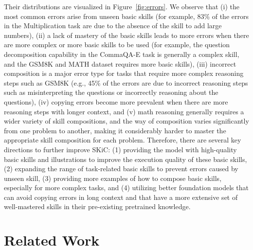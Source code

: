 \documentclass{article} \usepackage{arxiv}
\begin{document}
Their distributions are visualized in Figure~\ref{fig:errors}. We observe that (i) the most common errors arise from unseen basic skills (for example, 83\% of the errors in the Multiplication task are due to the absence of the skill to add large numbers), (ii) a lack of mastery of the basic skills leads to more errors when there are more complex or more basic skills to be used (for example, the question decomposition capability in the CommaQA-E task is generally a complex skill, and the GSM8K and MATH dataset requires more basic skills), (iii) incorrect composition is a major error type for tasks that require more complex reasoning steps such as GSM8K (e.g., 45\% of the errors are due to incorrect reasoning steps such as misinterpreting the questions or incorrectly reasoning about the questions), (iv) copying errors become more prevalent when there are more reasoning steps with longer context, and (v) math reasoning generally requires a wider variety of skill compositions, and the way of composition varies significantly from one problem to another, making it considerably harder to master the appropriate skill composition for each problem. Therefore, there are several key directions to further improve SKiC: (1) providing the model with high-quality basic skills and illustrations to improve the execution quality of these basic skills, (2) expanding the range of task-related basic skills to prevent errors caused by unseen skill, (3) providing more examples of how to compose basic skills, especially for more complex tasks, and (4) utilizing better foundation models that can avoid copying errors in long context and that have a more extensive set of well-mastered skills in their pre-existing pretrained knowledge.






 
\section{Related Work}
\label{sec: related works}
\end{document}
